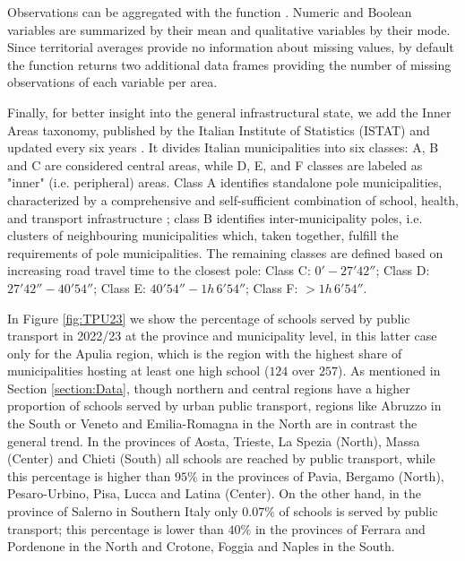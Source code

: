 \documentclass[openany]{book}
\begin{document}
Observations can be aggregated with the function \texttt{}. Numeric and Boolean variables are summarized by their mean and qualitative variables by their mode. Since territorial averages provide no information about missing values, by default the function returns two additional data frames providing the number of missing observations of each variable per area.

Finally, for better insight into the general infrastructural state, we add the Inner Areas taxonomy, published by the Italian Institute of Statistics (ISTAT) and updated every six years \citep{InnerAreas}. It divides Italian municipalities into six classes: A, B and C are considered central areas, while D, E, and F classes are labeled as "inner" (i.e. peripheral) areas. Class A identifies standalone pole municipalities, characterized by a comprehensive and self-sufficient combination of school, health, and transport infrastructure \citep{InnerAreas}; class B identifies inter-municipality poles, i.e. clusters of neighbouring municipalities which, taken together, fulfill the requirements of pole municipalities. The remaining classes are defined based on increasing road travel time to the closest pole: Class C: $0' - 27'42''$; Class D: $27'42'' - 40'54''$; Class E: $40'54'' - 1h \, 6' 54''$; Class F: $> 1h \, 6' 54''$.

In Figure \ref{fig:TPU23} we show the percentage of schools served by public transport in 2022/23 at the province and municipality level, in this latter case only for the Apulia region, which is the region with the highest share of municipalities hosting at least one high school ($124$ over $257$). As mentioned in Section \ref{section:Data}, though northern and central regions have a higher proportion of schools served by urban public transport, regions like Abruzzo in the South or Veneto and Emilia-Romagna in the North are in contrast the general trend. In the provinces of Aosta, Trieste, La Spezia (North), Massa (Center) and Chieti (South) all schools are reached by public transport, while this percentage is higher than $95\%$ in the provinces of Pavia, Bergamo (North), Pesaro-Urbino, Pisa, Lucca and Latina (Center). On the other hand, in the province of Salerno in Southern Italy only $0.07\%$ of schools is served by public transport; this percentage is lower than $40\%$ in the provinces of Ferrara and Pordenone in the North and Crotone, Foggia and Naples in the South.%
\end{document}
